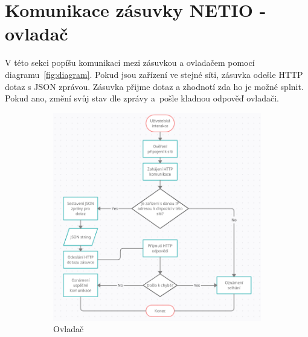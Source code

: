 \documentclass[a4paper, 12pt]{report}
\begin{document}
    \section{Komunikace zásuvky NETIO - ovladač}
    V této sekci popíšu komunikaci mezi zásuvkou a ovladačem pomocí diagramu~\ref{fig:diagram}.
    Pokud jsou zařízení ve stejné síti, zásuvka odešle HTTP dotaz s JSON zprávou.
    Zásuvka přijme dotaz a zhodnotí zda ho je možné splnit. Pokud ano, změní svůj stav dle zprávy a~pošle kladnou odpověď ovladači.
    \begin{figure}[h!]
        \centering
        \begin{subfigure}[b]{0.49\linewidth}
            \includegraphics[width=\linewidth]{images/Blokove schema button}
            \caption{Ovladač}
        \end{subfigure}
        \begin{subfigure}[b]{0.49\linewidth}

\end{subfigure}
\end{figure}
\end{document}
